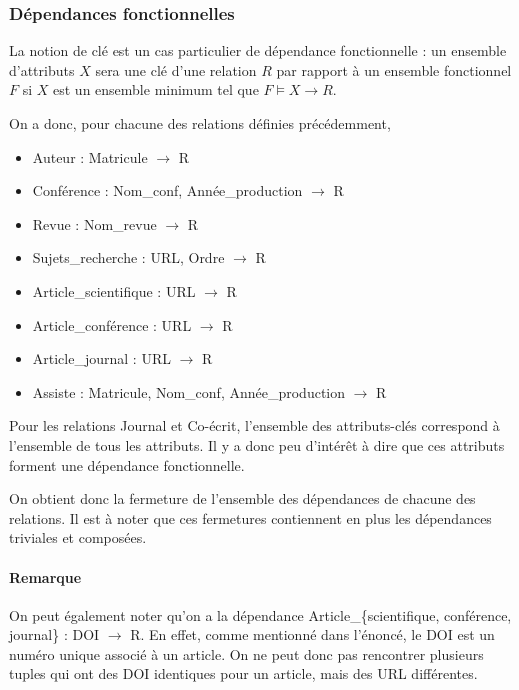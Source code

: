 \documentclass[a4paper, 12pt]{article}
\begin{document}
	\subsubsection{Dépendances fonctionnelles}
	La notion de clé est un cas particulier de dépendance fonctionnelle : un ensemble d'attributs $X$ sera une clé d'une relation $R$ par rapport à un ensemble fonctionnel $F$ si $X$ est un ensemble minimum tel que \texttt{\(F\models X\rightarrow R\)}.\par
	On a donc, pour chacune des relations définies précédemment,
	\begin{itemize}
		\item Auteur : Matricule $\rightarrow$ R
		\item Conférence : Nom\_conf, Année\_production $\rightarrow$ R
		\item Revue : Nom\_revue $\rightarrow$ R
		\item Sujets\_recherche : URL, Ordre $\rightarrow$ R
		\item Article\_scientifique : URL $\rightarrow$ R
		\item Article\_conférence : URL $\rightarrow$ R
		\item Article\_journal : URL $\rightarrow$ R
		\item Assiste : Matricule, Nom\_conf, Année\_production $\rightarrow$ R
	\end{itemize}
	Pour les relations Journal et Co-écrit, l'ensemble des attributs-clés correspond à l'ensemble de tous les attributs. Il y a donc peu d'intérêt à dire que ces attributs forment une dépendance fonctionnelle.\par
	On obtient donc la fermeture de l'ensemble des dépendances de chacune des relations. Il est à noter que ces fermetures contiennent en plus les dépendances triviales et composées.
	\paragraph{Remarque} On peut également noter qu'on a la dépendance Article\_\{scientifique, conférence, journal\} : DOI $\rightarrow$ R. En effet, comme mentionné dans l'énoncé, le DOI est un numéro unique associé à un article. On ne peut donc pas rencontrer plusieurs tuples qui ont des DOI identiques pour un article, mais des URL différentes.
\end{document}
